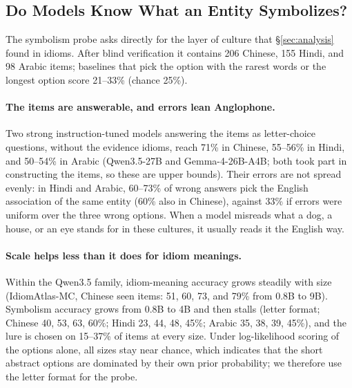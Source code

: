 \subsection{Do Models Know What an Entity Symbolizes?}
\label{sec:results-probe}

The symbolism probe asks directly for the layer of culture that \S\ref{sec:analysis} found in idioms. After blind verification it contains 206 Chinese, 155 Hindi, and 98 Arabic items; baselines that pick the option with the rarest words or the longest option score 21--33\% (chance 25\%).

\paragraph{The items are answerable, and errors lean Anglophone.}
Two strong instruction-tuned models answering the items as letter-choice questions, without the evidence idioms, reach 71\% in Chinese, 55--56\% in Hindi, and 50--54\% in Arabic (Qwen3.5-27B and Gemma-4-26B-A4B; both took part in constructing the items, so these are upper bounds). Their errors are not spread evenly: in Hindi and Arabic, 60--73\% of wrong answers pick the English association of the same entity (60\% also in Chinese), against 33\% if errors were uniform over the three wrong options. When a model misreads what a dog, a house, or an eye stands for in these cultures, it usually reads it the English way.

\paragraph{Scale helps less than it does for idiom meanings.}
Within the Qwen3.5 family, idiom-meaning accuracy grows steadily with size (IdiomAtlas-MC, Chinese seen items: 51, 60, 73, and 79\% from 0.8B to 9B). Symbolism accuracy grows from 0.8B to 4B and then stalls (letter format; Chinese 40, 53, 63, 60\%; Hindi 23, 44, 48, 45\%; Arabic 35, 38, 39, 45\%), and the lure is chosen on 15--37\% of items at every size. Under log-likelihood scoring of the options alone, all sizes stay near chance, which indicates that the short abstract options are dominated by their own prior probability; we therefore use the letter format for the probe.

